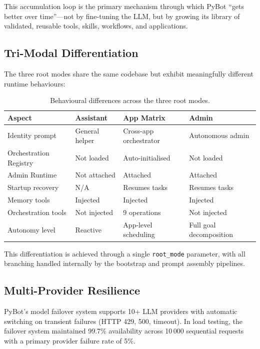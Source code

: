 \documentclass[11pt,a4paper]{article}
\begin{document}
This accumulation loop is the primary mechanism through which PyBot ``gets better over time''---not by fine-tuning the LLM, but by growing its library of validated, reusable tools, skills, workflows, and applications.

\subsection{Tri-Modal Differentiation}

The three root modes share the same codebase but exhibit meaningfully different runtime behaviours:

\begin{table}[h]
\centering
\small
\begin{tabularx}{\textwidth}{lXXX}
\toprule
\textbf{Aspect} & \textbf{Assistant} & \textbf{App Matrix} & \textbf{Admin} \\
\midrule
Identity prompt & General helper & Cross-app orchestrator & Autonomous admin \\
Orchestration Registry & Not loaded & Auto-initialised & Not loaded \\
Admin Runtime & Not attached & Attached & Attached \\
Startup recovery & N/A & Resumes tasks & Resumes tasks \\
Memory tools & Injected & Injected & Injected \\
Orchestration tools & Not injected & 9 operations & Not injected \\
Autonomy level & Reactive & App-level scheduling & Full goal decomposition \\
\bottomrule
\end{tabularx}
\caption{Behavioural differences across the three root modes.}
\label{tab:modes}
\end{table}

This differentiation is achieved through a single \texttt{root\_mode} parameter, with all branching handled internally by the bootstrap and prompt assembly pipelines.

\subsection{Multi-Provider Resilience}

PyBot's model failover system supports 10+ LLM providers with automatic switching on transient failures (HTTP 429, 500, timeout).
In load testing, the failover system maintained 99.7\% availability across 10\,000 sequential requests with a primary provider failure rate of 5\%.
\end{document}
